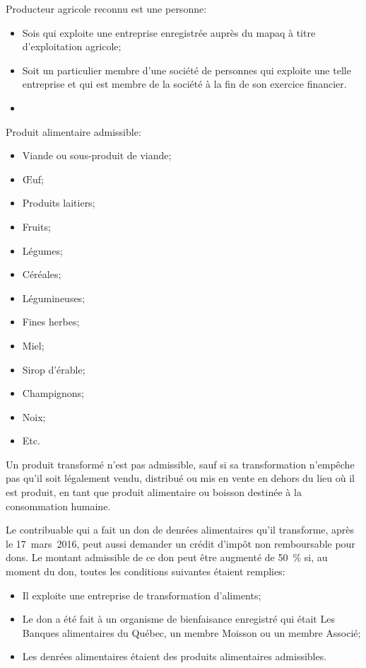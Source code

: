 Producteur agricole reconnu est une personne:
\begin{itemize}
	\item Sois qui exploite une entreprise enregistrée auprès du \acrfull{mapaq} à titre d'exploitation agricole;
	\item Soit un particulier membre d'une société de personnes qui exploite une telle entreprise et qui est membre de la société à la fin de son exercice financier.
	\item 
\end{itemize}

Produit alimentaire admissible:
\begin{itemize}[label=]
	\item Viande ou sous-produit de viande;
	\item Œuf;
	\item Produits laitiers;
	\item Fruits;
	\item Légumes;
	\item Céréales;
	\item Légumineuses;
	\item Fines herbes;
	\item Miel;
	\item Sirop d'érable;
	\item Champignons;
	\item Noix;
	\item Etc.
\end{itemize}

\begin{note}
	Un produit transformé n'est pas admissible, sauf si sa transformation n'empêche pas qu'il soit légalement vendu, distribué ou mis en vente en dehors du lieu où il est produit, en tant que produit alimentaire ou boisson destinée à la consommation humaine.
\end{note}

Le contribuable qui a fait un don de denrées alimentaires qu'il transforme, après le 17~mars~2016, peut aussi demander un crédit d'impôt non remboursable pour dons. Le montant admissible de ce don peut être augmenté de 50~\% si, au moment du don, toutes les conditions suivantes étaient remplies:
\begin{itemize}
	\item Il exploite une entreprise de transformation d'aliments;
	\item Le don a été fait à un organisme de bienfaisance enregistré qui était Les Banques alimentaires du Québec, un membre Moisson ou un membre Associé;
	\item Les denrées alimentaires étaient des produits alimentaires admissibles.
\end{itemize}


